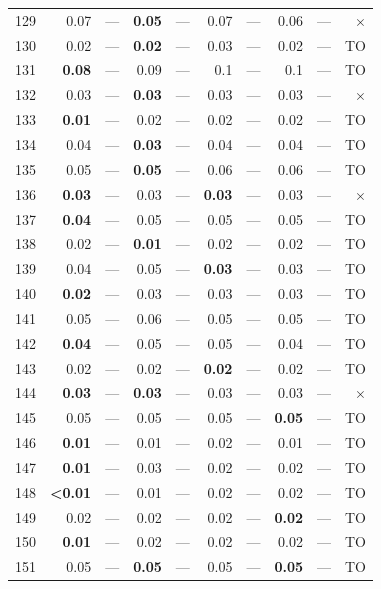 \begin{longtable}{lr@{\hskip 4pt}l@{\hskip 12pt}r@{\hskip 4pt}l@{\hskip 12pt}r@{\hskip 4pt}l@{\hskip 12pt}r@{\hskip 4pt}l@{\hskip 12pt}r}
129 & 0.07 & --- & \textbf{0.05} & --- & 0.07 & --- & 0.06 & --- & $\times$ \\
130 & 0.02 & --- & \textbf{0.02} & --- & 0.03 & --- & 0.02 & --- & TO \\
131 & \textbf{0.08} & --- & 0.09 & --- & 0.1 & --- & 0.1 & --- & TO \\
132 & 0.03 & --- & \textbf{0.03} & --- & 0.03 & --- & 0.03 & --- & $\times$ \\
133 & \textbf{0.01} & --- & 0.02 & --- & 0.02 & --- & 0.02 & --- & TO \\
134 & 0.04 & --- & \textbf{0.03} & --- & 0.04 & --- & 0.04 & --- & TO \\
135 & 0.05 & --- & \textbf{0.05} & --- & 0.06 & --- & 0.06 & --- & TO \\
136 & \textbf{0.03} & --- & 0.03 & --- & \textbf{0.03} & --- & 0.03 & --- & $\times$ \\
137 & \textbf{0.04} & --- & 0.05 & --- & 0.05 & --- & 0.05 & --- & TO \\
138 & 0.02 & --- & \textbf{0.01} & --- & 0.02 & --- & 0.02 & --- & TO \\
139 & 0.04 & --- & 0.05 & --- & \textbf{0.03} & --- & 0.03 & --- & TO \\
140 & \textbf{0.02} & --- & 0.03 & --- & 0.03 & --- & 0.03 & --- & TO \\
141 & 0.05 & --- & 0.06 & --- & 0.05 & --- & 0.05 & --- & TO \\
142 & \textbf{0.04} & --- & 0.05 & --- & 0.05 & --- & 0.04 & --- & TO \\
143 & 0.02 & --- & 0.02 & --- & \textbf{0.02} & --- & 0.02 & --- & TO \\
144 & \textbf{0.03} & --- & \textbf{0.03} & --- & 0.03 & --- & 0.03 & --- & $\times$ \\
145 & 0.05 & --- & 0.05 & --- & 0.05 & --- & \textbf{0.05} & --- & TO \\
146 & \textbf{0.01} & --- & 0.01 & --- & 0.02 & --- & 0.01 & --- & TO \\
147 & \textbf{0.01} & --- & 0.03 & --- & 0.02 & --- & 0.02 & --- & TO \\
148 & \textbf{<0.01} & --- & 0.01 & --- & 0.02 & --- & 0.02 & --- & TO \\
149 & 0.02 & --- & 0.02 & --- & 0.02 & --- & \textbf{0.02} & --- & TO \\
150 & \textbf{0.01} & --- & 0.02 & --- & 0.02 & --- & 0.02 & --- & TO \\
151 & 0.05 & --- & \textbf{0.05} & --- & 0.05 & --- & \textbf{0.05} & --- & TO \\

\end{longtable}
